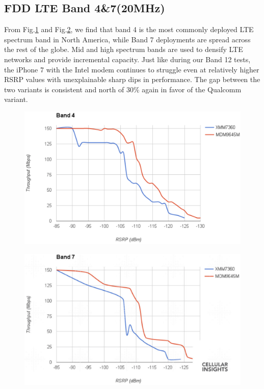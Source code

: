 \documentclass[conference]{IEEEtran}
\begin{document}
\subsection{FDD LTE Band 4\&7(20MHz)}
From Fig.\ref{fig:band4} and Fig.\ref{fig:band7}, we find that band 4 is the most commonly deployed LTE spectrum band in North America, while Band 7 deployments are spread across the rest of the globe. Mid and high spectrum bands are used to densify LTE networks and provide incremental capacity. Just like during our Band 12 tests, the iPhone 7 with the Intel modem continues to struggle even at relatively higher RSRP values with unexplainable sharp dips in performance. The gap between the two variants is consistent and north of 30\% again in favor of the Qualcomm variant.
\begin{figure}[!ht]
	\centering
	\begin{center}
		\includegraphics*[width=0.8\linewidth]{band4}
		\caption{}
		\label{fig:band4}
	\end{center}
\end{figure}

\begin{figure}[!ht]
	\centering
	\begin{center}
		\includegraphics*[width=0.8\linewidth]{band7}
		\caption{} 
		\label{fig:band7}
	\end{center}
\end{figure}
\end{document}
